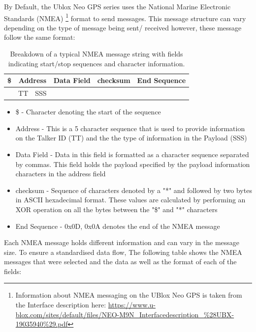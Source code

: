 By Default, the Ublox Neo GPS series uses the National Marine Electronic Standards (NMEA) \footnote{Information about NMEA messaging on the UBlox Neo GPS is taken from the Interface description here: \url{https://www.u-blox.com/sites/default/files/NEO-M9N_Interfacedescription_\%28UBX-19035940\%29.pdf}} format to send messages. This message structure can vary depending on the type of message being sent/ received however, these message follow the same format:

\begin{table}[H]
	\centering
	\caption{ Breakdown of a typical NMEA message string with fields indicating start/stop sequences and character information.}
	\begin{tabular}{|c|c|c|c|c|c|}
		\hline
		\$    & \multicolumn{2}{|c|}{Address} & Data Field & checksum & End Sequence\\
		\hline
		\multicolumn{1}{c|}{} & TT & SSS &\multicolumn{3}{c}{} \\
		\cline{2-3}
	\end{tabular}
	
	\label{tab:GPS_data_format}
\end{table}
\begin{itemize}
	\item \$ - Character denoting the start of the sequence
	\item Address - This is a 5 character sequence that is used to provide information on the Talker ID (TT) and the the type of information in the Payload (SSS)
	\item Data Field - Data in this field is formatted as a character sequence separated by commas. This field holds the payload specified by the payload information characters in the address field
	\item checksum - Sequence of characters denoted by a "*" and followed by two bytes in ASCII hexadecimal format. These values are calculated by performing an XOR operation on all the bytes between the "\$" and "*" characters
	\item End Sequence - 0x0D, 0x0A denotes the end of the  NMEA message
\end{itemize}

Each NMEA message holds different information and can vary in the message size. To ensure a standardised data flow, The following table shows the NMEA messages that were selected and the data as well as the format of each of the fields:

